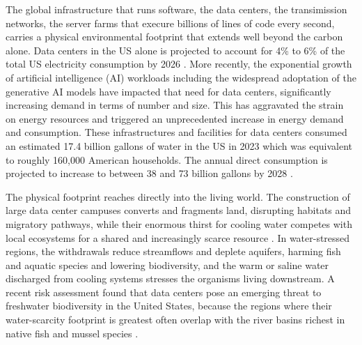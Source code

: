The global infrastructure that runs software, the data centers, the transimission networks, the server farms that execure billions of lines of code every second, carries a physical environmental footprint that extends well beyond the carbon alone. Data centers in the US alone is projected to account for 4\% to 6\% of the total US electricity consumption by 2026 \cite{datacenter_consumption_2024}. More recently, the exponential growth of artificial intelligence (AI) workloads including the widespread adoptation of the generative AI models have impacted that need for data centers, significantly increasing demand in terms of number and size. This has aggravated the strain on energy resources and triggered an unprecedented increase in energy demand and consumption. These infrastructures and facilities for data centers consumed an estimated 17.4 billion gallons of water in the US in 2023 which was equivalent to roughly 160,000 American households. The annual direct consumption is projected to increase to between 38 and 73 billion gallons by 2028 \cite{datacenter_water_use}.

The physical footprint reaches directly into the living world. The construction of large data center campuses converts and fragments land, disrupting habitats and migratory pathways, while their enormous thirst for cooling water competes with local ecosystems for a shared and increasingly scarce resource \cite{nwf_datacenter_water_use}. In water-stressed regions, the withdrawals reduce streamflows and deplete aquifers, harming fish and aquatic species and lowering biodiversity, and the warm or saline water discharged from cooling systems stresses the organisms living downstream. A recent risk assessment found that data centers pose an emerging threat to freshwater biodiversity in the United States, because the regions where their water-scarcity footprint is greatest often overlap with the river basins richest in native fish and mussel species \cite{JAGER2026100585}. 

